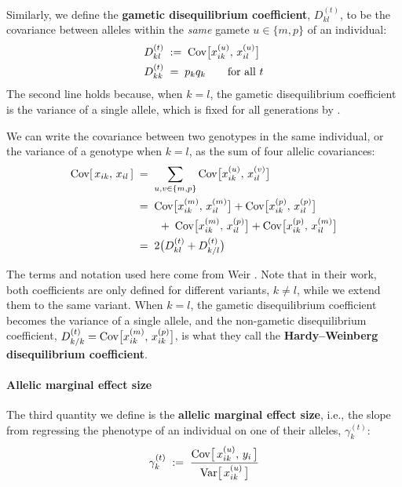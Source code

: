 \documentclass[12pt]{article}
\numberwithin{equation}{section}
\begin{document}
Similarly, we define the \textbf{gametic disequilibrium coefficient}, $D^{(t)}_{kl}$, to be the covariance between alleles within the \emph{same} gamete $u \in \{m,p\}$ of an individual:
\begin{equation}\label{eq:D-gametic}
\begin{aligned}
    D^{(t)}_{kl} \;&:=\; \mathrm{Cov}\big[x^{(u)}_{ik},\, x^{(u)}_{il}\big] \\
    D^{(t)}_{kk} \;&=\; p_k q_k \qquad \text{for all } t
\end{aligned}
\end{equation}
The second line holds because, when $k = l$, the gametic disequilibrium coefficient is the variance of a single allele, which is fixed for all generations by .

We can write the covariance between two genotypes in the same individual, or the variance of a genotype when $k = l$, as the sum of four allelic covariances:
\begin{equation}\label{eq:x-from-D}
\begin{aligned}
    \mathrm{Cov}[\,x_{ik},\, x_{il}\,]
    \;&=\; \sum_{u,v \in \{m,p\}} \mathrm{Cov}\big[x^{(u)}_{ik},\, x^{(v)}_{il}\big] \\
    \;&=\; \mathrm{Cov}\big[x^{(m)}_{ik},\, x^{(m)}_{il}\big] + \mathrm{Cov}\big[x^{(p)}_{ik},\, x^{(p)}_{il}\big] \\
    &\qquad +\; \mathrm{Cov}\big[x^{(m)}_{ik},\, x^{(p)}_{il}\big] + \mathrm{Cov}\big[x^{(p)}_{ik},\, x^{(m)}_{il}\big] \\
    \;&=\; 2\big(D^{(t)}_{kl} + D^{(t)}_{k/l}\big)
\end{aligned}
\end{equation}

The terms and notation used here come from Weir \citep{weir1996book}.
Note that in their work, both coefficients are only defined for different variants, $k \neq l$, while we extend them to the same variant.
When $k=l$, the gametic disequilibrium coefficient becomes the variance of a single allele, and the non-gametic disequilibrium coefficient, $D^{(t)}_{k/k} = \mathrm{Cov}\big[x^{(m)}_{ik},\, x^{(p)}_{ik}\big]$, is what they call the \textbf{Hardy--Weinberg disequilibrium coefficient}.

\paragraph{Allelic marginal effect size}
The third quantity we define is the \textbf{allelic marginal effect size}, i.e., the slope from regressing the phenotype of an individual on one of their alleles, $\gamma_{k}^{(t)}$:
\begin{equation}\label{eq:gamma-def}
    \gamma^{(t)}_k \;:=\; \frac{\mathrm{Cov}\big[\,x^{(u)}_{ik},\, y_i\,\big]}{\mathrm{Var}\big[\,x^{(u)}_{ik}\,\big]}
\end{equation}
\end{document}
